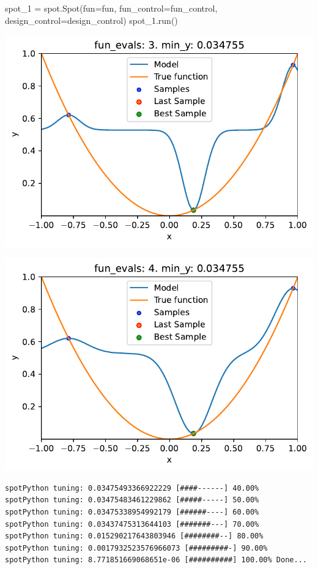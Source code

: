 \documentclass[
  letterpaper,
  DIV=11,
  numbers=noendperiod]{scrreprt}
\newenvironment{Shaded}{\begin{snugshade}}{\end{snugshade}}
\newcommand{\NormalTok}[1]{\textcolor[rgb]{0.00,0.23,0.31}{#1}}
\newcommand{\OperatorTok}[1]{\textcolor[rgb]{0.37,0.37,0.37}{#1}}
\begin{document}
\begin{Shaded}
\begin{Highlighting}[]
\NormalTok{spot\_1 }\OperatorTok{=}\NormalTok{ spot.Spot(fun}\OperatorTok{=}\NormalTok{fun,}
\NormalTok{                    fun\_control}\OperatorTok{=}\NormalTok{fun\_control,}
\NormalTok{                    design\_control}\OperatorTok{=}\NormalTok{design\_control)}
\NormalTok{spot\_1.run()}
\end{Highlighting}
\end{Shaded}

\includegraphics{010_num_spot_sklearn_surrogate_files/figure-pdf/cell-20-output-1.pdf}

\includegraphics{010_num_spot_sklearn_surrogate_files/figure-pdf/cell-20-output-2.pdf}

\begin{verbatim}
spotPython tuning: 0.03475493366922229 [####------] 40.00% 
spotPython tuning: 0.03475483461229862 [#####-----] 50.00% 
spotPython tuning: 0.03475338954992179 [######----] 60.00% 
spotPython tuning: 0.03437475313644103 [#######---] 70.00% 
spotPython tuning: 0.015290217643803946 [########--] 80.00% 
spotPython tuning: 0.0017932523576966073 [#########-] 90.00% 
spotPython tuning: 8.771851669068651e-06 [##########] 100.00% Done...
\end{verbatim}
\end{document}
